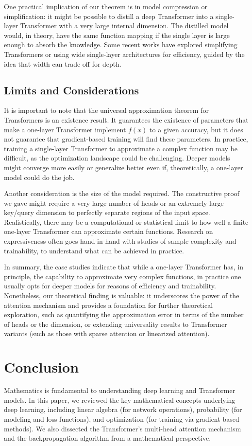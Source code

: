 \documentclass[conference]{IEEEtran}
\begin{document}
One practical implication of our theorem is in model compression or simplification: it might be possible to distill a deep Transformer into a single-layer Transformer with a very large internal dimension. The distilled model would, in theory, have the same function mapping if the single layer is large enough to absorb the knowledge. Some recent works have explored simplifying Transformers or using wide single-layer architectures for efficiency, guided by the idea that width can trade off for depth.

\subsection{Limits and Considerations}
It is important to note that the universal approximation theorem for Transformers is an existence result. It guarantees the existence of parameters that make a one-layer Transformer implement $f(x)$ to a given accuracy, but it does not guarantee that gradient-based training will find these parameters. In practice, training a single-layer Transformer to approximate a complex function may be difficult, as the optimization landscape could be challenging. Deeper models might converge more easily or generalize better even if, theoretically, a one-layer model could do the job.

Another consideration is the size of the model required. The constructive proof we gave might require a very large number of heads or an extremely large key/query dimension to perfectly separate regions of the input space. Realistically, there may be a computational or statistical limit to how well a finite one-layer Transformer can approximate certain functions. Research on expressiveness often goes hand-in-hand with studies of sample complexity and trainability, to understand what can be achieved in practice.

In summary, the case studies indicate that while a one-layer Transformer has, in principle, the capability to approximate very complex functions, in practice one usually opts for deeper models for reasons of efficiency and trainability. Nonetheless, our theoretical finding is valuable: it underscores the power of the attention mechanism and provides a foundation for further theoretical exploration, such as quantifying the approximation error in terms of the number of heads or the dimension, or extending universality results to Transformer variants (such as those with sparse attention or linearized attention).

\section{Conclusion}
Mathematics is fundamental to understanding deep learning and Transformer models. In this paper, we reviewed the key mathematical concepts underlying deep learning, including linear algebra (for network operations), probability (for modeling and loss functions), and optimization (for training via gradient-based methods). We also dissected the Transformer's multi-head attention mechanism and the backpropagation algorithm from a mathematical perspective. 
\end{document}
